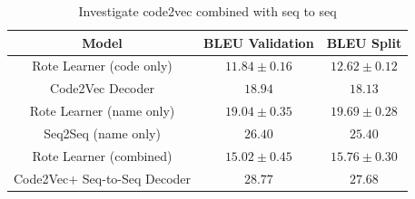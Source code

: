 \begin{table}[h!]
\begin{center}
\begin{tabular}{ c | c | c  }
    Model                             & BLEU Validation  & BLEU Split     \\
    \hline
    Rote Learner  (code only)        & $ 11.84 \pm  0.16 $ & $ 12.62 \pm 0.12 $ \\
    Code2Vec Decoder                 & $ 18.94 $ & $ 18.13 $ \\
    \hline
    \hline
    Rote Learner  (name only)         & $ 19.04 \pm  0.35 $ & $ 19.69 \pm 0.28 $ \\
    Seq2Seq (name only)               & $ 26.40 $ & $ 25.40 $ \\
    \hline
    \hline
    Rote Learner (combined)            & $ 15.02 \pm  0.45 $ & $ 15.76 \pm 0.30$ \\
    Code2Vec+ Seq-to-Seq Decoder       & $ 28.77 $ & $ 27.68 $ \\
    \hline
\end{tabular}
\caption {Investigate code2vec combined with seq to seq}
\label{table:code2vec_embed}
\end{center}
\end{table}

